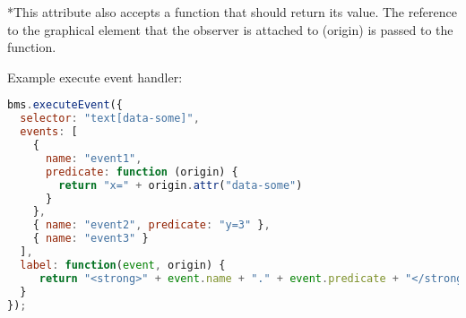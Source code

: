 *This attribute also accepts a function that should return its value.
The reference to the graphical element that the observer is attached to (origin) is passed to the function.

%

Example execute event handler:

\begin{lstlisting}[language=JavaScript]
bms.executeEvent({
  selector: "text[data-some]",
  events: [
    { 
      name: "event1", 
      predicate: function (origin) {
        return "x=" + origin.attr("data-some") 
      }
    },
    { name: "event2", predicate: "y=3" },
    { name: "event3" } 
  ],
  label: function(event, origin) {
     return "<strong>" + event.name + "." + event.predicate + "</strong>";
  }
});
\end{lstlisting}
